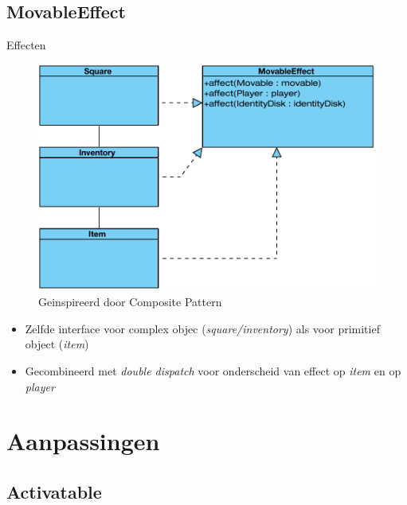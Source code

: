 \documentclass[t]{beamer}
\begin{document}
\subsection{MovableEffect}
\begin{frame}{Effecten}
\begin{multicols}{2}
\begin{minipage}{\columnwidth}
\begin{figure}
	\center
	\includegraphics[width=\linewidth]{img/composite.pdf}
	\caption{Geinspireerd door Composite Pattern}
\end{figure}
\end{minipage}
\begin{minipage}{\columnwidth}
\begin{itemize}
	\item Zelfde interface voor complex objec (\textit{square/inventory}) als voor primitief object (\textit{item}) 
	\item Gecombineerd met \textit{double dispatch} voor onderscheid van effect op \textit{item} en op \textit{player}
\end{itemize}
\end{minipage}


\end{multicols}
\end{frame}

\section{Aanpassingen}

\subsection{Activatable}
\end{document}
